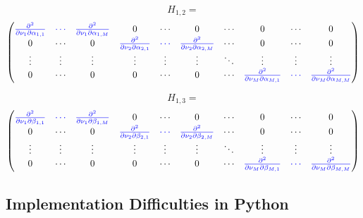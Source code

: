 $$H_{1,2} =  $$
\begin{equation}
\begin{pmatrix}
\textcolor{blue}{\frac{\partial^2 } {\partial \nu_1 \partial \alpha_{1,1} }}
&
 \textcolor{blue}{\cdots }
& 
 \textcolor{blue}{\frac{\partial^2 }{\partial \nu_1 \partial \alpha_{1,M} } } 
&
0 & \cdots & 0  & \cdots & 0 & \cdots & 0
\\%
0       &  \cdots   & 0 &  
\textcolor{blue}{\frac{\partial^2 }{\partial \nu_2 \partial \alpha_{2,1} }}  & 
\textcolor{blue}{\cdots} &  
\textcolor{blue}{\frac{\partial^2 }{\partial \nu_2 \partial \alpha_{2,M} }} & \cdots & 0 & \cdots & 0
\\%
\vdots & \vdots & \vdots & \vdots & \vdots & \vdots  & \ddots & \vdots & \vdots & \vdots
\\%
0  & \cdots & 0 & 0 & \cdots & 0 & \cdots & 
\textcolor{blue}{\frac{\partial^2 } {\partial \nu_M \partial \alpha_{M,1} }} &
\textcolor{blue}{\cdots} & 
\textcolor{blue}{\frac{\partial^2 } {\partial \nu_M \partial \alpha_{M,M} } }
\end{pmatrix}     
\end{equation}

$$H_{1,3} = $$
\begin{equation} 
\begin{pmatrix}
\textcolor{blue}{\frac{\partial^2 } {\partial \nu_1 \partial \beta_{1,1} }}
&
 \textcolor{blue}{\cdots }
& 
 \textcolor{blue}{\frac{\partial^2 }{\partial \nu_1 \partial \beta_{1,M} } } 
&
0 & \cdots & 0  & \cdots & 0 & \cdots & 0
\\%
0       &  \cdots   & 0 &  
\textcolor{blue}{\frac{\partial^2 }{\partial \nu_2 \partial \beta_{2,1} }}  & 
\textcolor{blue}{\cdots} &  
\textcolor{blue}{\frac{\partial^2 }{\partial \nu_2 \partial \beta_{2,M} }} & \cdots & 0 & \cdots & 0
\\%
\vdots & \vdots & \vdots & \vdots & \vdots & \vdots  & \ddots & \vdots & \vdots & \vdots
\\%
0  & \cdots & 0 & 0 & \cdots & 0 & \cdots & 
\textcolor{blue}{\frac{\partial^2 } {\partial \nu_M \partial \beta_{M,1} }} &
\textcolor{blue}{\cdots} & 
\textcolor{blue}{\frac{\partial^2 } {\partial \nu_M \partial \beta_{M,M} } }
\end{pmatrix}     
\end{equation}


\subsection{Implementation Difficulties in Python}

